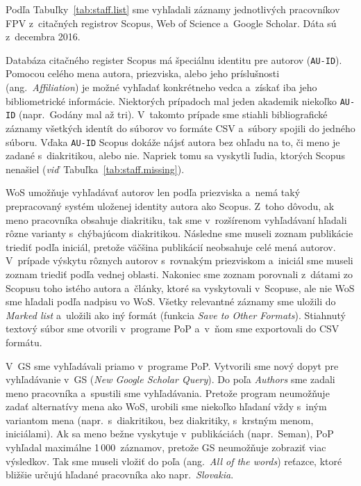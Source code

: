 Podľa Tabuľky~\ref{tab:staff.list} sme vyhľadali záznamy jednotlivých
pracovníkov FPV z~citačných registrov Scopus, Web of Science a~Google Scholar.
Dáta sú z~decembra 2016.

Databáza citačného register Scopus má špeciálnu identitu pre autorov
(\texttt{AU-ID}).  Pomocou celého mena autora, priezviska, alebo jeho
príslušnosti (ang.~\emph{Affiliation}) je možné vyhľadať konkrétneho vedca
a~získať iba jeho bibliometrické informácie.  Niektorých prípadoch mal jeden
akademik niekoľko \texttt{AU-ID} (napr.~Godány mal až tri).  V~takomto prípade
sme stiahli bibliografické záznamy všetkých identít do súborov vo formáte CSV
a~súbory spojili do jedného súboru.  Vďaka \texttt{AU-ID} Scopus dokáže nájsť
autora bez ohľadu na to, či meno je zadané s~diakritikou, alebo nie.  Napriek
tomu sa vyskytli ľudia, ktorých Scopus nenašiel
(\emph{viď}~Tabuľka~\ref{tab:staff.missing}).

WoS umožňuje vyhľadávať autorov len podľa priezviska a~nemá taký prepracovaný
systém uloženej identity autora ako Scopus.  Z~toho dôvodu, ak meno pracovníka
obsahuje diakritiku, tak sme v~rozšírenom vyhľadávaní hľadali rôzne varianty
s~chýbajúcom diakritikou.  Následne sme museli zoznam publikácie triediť podľa
iniciál, pretože väčšina publikácií neobsahuje celé mená autorov.  V~prípade
výskytu rôznych autorov s~rovnakým priezviskom a~iniciál sme museli zoznam
triediť podľa vednej oblasti.  Nakoniec sme zoznam porovnali z~dátami zo Scopusu
toho istého autora a~články, ktoré sa vyskytovali v~Scopuse, ale nie WoS sme
hľadali podľa nadpisu vo WoS.  Všetky relevantné záznamy sme uložili do
\emph{Marked list} a~uložili ako iný formát (funkcia \emph{Save to Other
  Formats}).  Stiahnutý textový súbor sme otvorili v~programe PoP a~v~ňom sme
exportovali do CSV formátu.

V~GS sme vyhľadávali priamo v~programe PoP.  Vytvorili sme nový dopyt pre
vyhľadávanie v~GS (\emph{New Google Scholar Query}).  Do poľa \emph{Authors} sme
zadali meno pracovníka a~spustili sme vyhľadávania.  Pretože program neumožňuje
zadať alternatívy mena ako WoS, urobili sme niekoľko hľadaní vždy s~iným
variantom mena (napr.~s~diakritikou, bez diakritiky, s~krstným menom,
iniciálami).  Ak sa meno bežne vyskytuje v~publikáciách (napr.~Seman), PoP
vyhľadal maximálne 1\,000~záznamov, pretože GS neumožňuje zobraziť viac
výsledkov.  Tak sme museli vložiť do poľa  (ang.~\emph{All of
  the words}) reťazce, ktoré bližšie určujú hľadané pracovníka ako
napr.~\emph{Slovakia}.


